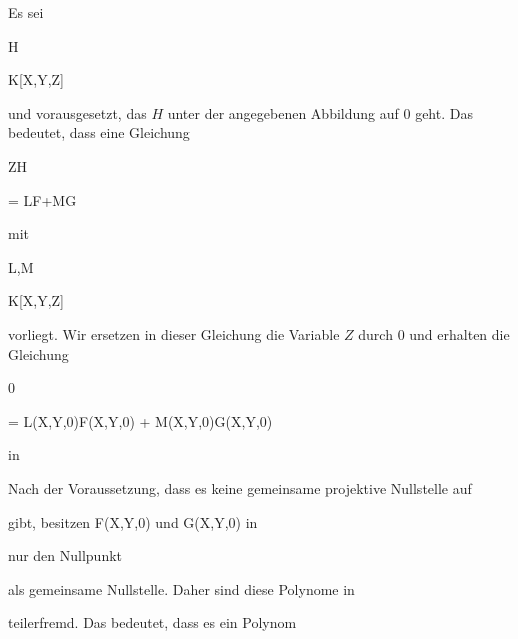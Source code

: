 {


Es sei


\mavergleichskette

{\vergleichskette

{ H
}

{ \in }{ K[X,Y,Z]
}

{  }{
}

{    }{
}

{   }{
}

}
{}{}{}
und vorausgesetzt, das $H$ unter der angegebenen Abbildung auf $0$ geht. Das bedeutet, dass eine Gleichung


\mavergleichskettedisp

{\vergleichskette

{ ZH
}

{ =} { LF+MG
}

{ } {
}

{ } {
}

{ } {
}

}
{}{}{}
mit


\mavergleichskette

{\vergleichskette

{ L,M
}

{ \in }{ K[X,Y,Z]
}

{  }{
}

{    }{
}

{   }{
}

}
{}{}{}
vorliegt. Wir ersetzen in dieser Gleichung die Variable $Z$ durch $0$ und erhalten die Gleichung


\mavergleichskettedisp

{\vergleichskette

{ 0
}

{ =} { L(X,Y,0)F(X,Y,0) + M(X,Y,0)G(X,Y,0)
}

{ } {
}

{ } {
}

{ } {
}

}
{}{}{}
in

 Nach der Voraussetzung, dass es keine gemeinsame projektive Nullstelle auf

 gibt, besitzen
\mathkor {} {F(X,Y,0)} {und} {G(X,Y,0)} {}
in

 nur den Nullpunkt

 als gemeinsame Nullstelle. Daher sind diese Polynome in

 teilerfremd. Das bedeutet, dass es ein Polynom


}
